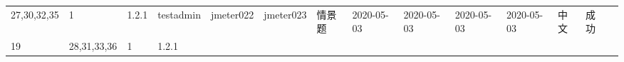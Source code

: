 \documentclass[hyperref, a4paper]{ctexart}
\begin{document}
\begin{longtable}[]{@{}llllllllllllll@{}}
\begin{minipage}[t]{0.05\columnwidth}
27,30,32,35\strut
\end{minipage} & \begin{minipage}[t]{0.03\columnwidth}\raggedright
1\strut
\end{minipage} & \begin{minipage}[t]{0.07\columnwidth}\raggedright
1.2.1\strut
\end{minipage} & \begin{minipage}[t]{0.04\columnwidth}\raggedright
testadmin\strut
\end{minipage} & \begin{minipage}[t]{0.04\columnwidth}\raggedright
jmeter022\strut
\end{minipage} & \begin{minipage}[t]{0.04\columnwidth}\raggedright
jmeter023\strut
\end{minipage} & \begin{minipage}[t]{0.03\columnwidth}\raggedright
情景题\strut
\end{minipage} & \begin{minipage}[t]{0.05\columnwidth}\raggedright
2020-05-03\strut
\end{minipage} & \begin{minipage}[t]{0.05\columnwidth}\raggedright
2020-05-03\strut
\end{minipage} & \begin{minipage}[t]{0.08\columnwidth}\raggedright
2020-05-03\strut
\end{minipage} & \begin{minipage}[t]{0.08\columnwidth}\raggedright
2020-05-03\strut
\end{minipage} & \begin{minipage}[t]{0.04\columnwidth}\raggedright
中文\strut
\end{minipage} & \begin{minipage}[t]{0.02\columnwidth}\raggedright
成功\strut
\end{minipage}\tabularnewline
\begin{minipage}[t]{0.02\columnwidth}\raggedright
19\strut
\end{minipage} & \begin{minipage}[t]{0.05\columnwidth}\raggedright
28,31,33,36\strut
\end{minipage} & \begin{minipage}[t]{0.03\columnwidth}\raggedright
1\strut
\end{minipage} & \begin{minipage}[t]{0.07\columnwidth}\raggedright
1.2.1\strut

\end{minipage}
\end{longtable}
\end{document}
